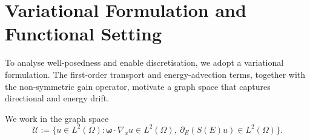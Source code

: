\documentclass[10pt,a4paper]{amsart}
\newcommand{\qp}[1]{\ensuremath{\!\left({#1}\right)}}
\renewcommand{\vec}[1]{\ensuremath{\boldsymbol{#1}}}
\begin{document}
\section{Variational Formulation and Functional Setting}
\label{sec:variational}

To analyse well-posedness and enable discretisation, we adopt a
variational formulation. The first-order transport and energy-advection
terms, together with the non-symmetric gain operator, motivate a graph
space that captures directional and energy drift.

We work in the graph space
\begin{equation}
  \label{eq:Uspace}
  \mathcal{U}
  :=
  \Big\{ u \in L^2(\Omega)  : 
  \vec{\omega}\cdot\nabla_x u \in L^2(\Omega),
  \ \partial_E\qp{S(E)u} \in L^2(\Omega) \Big\}.
\end{equation}
\end{document}
